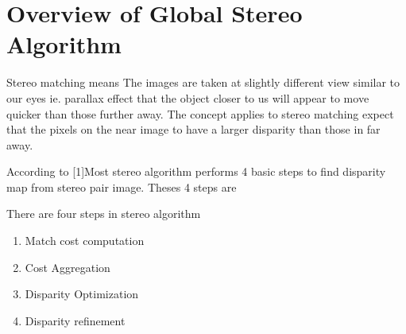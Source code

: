 \chapter{Overview of Global Stereo  Algorithm}

Stereo matching means The images are taken at slightly different view similar to our eyes  ie. parallax effect that the object closer to us will appear to move quicker than those further away. The concept applies to stereo matching expect that the pixels on the near image to have a larger disparity than those in far away.

According to [1]Most stereo algorithm performs 4 basic steps to find disparity map from stereo pair image. Theses 4  steps are

There are four steps in stereo algorithm
\begin{enumerate}
  \item Match cost computation
  \item Cost Aggregation
  \item Disparity Optimization
  \item Disparity refinement

\end{enumerate}

